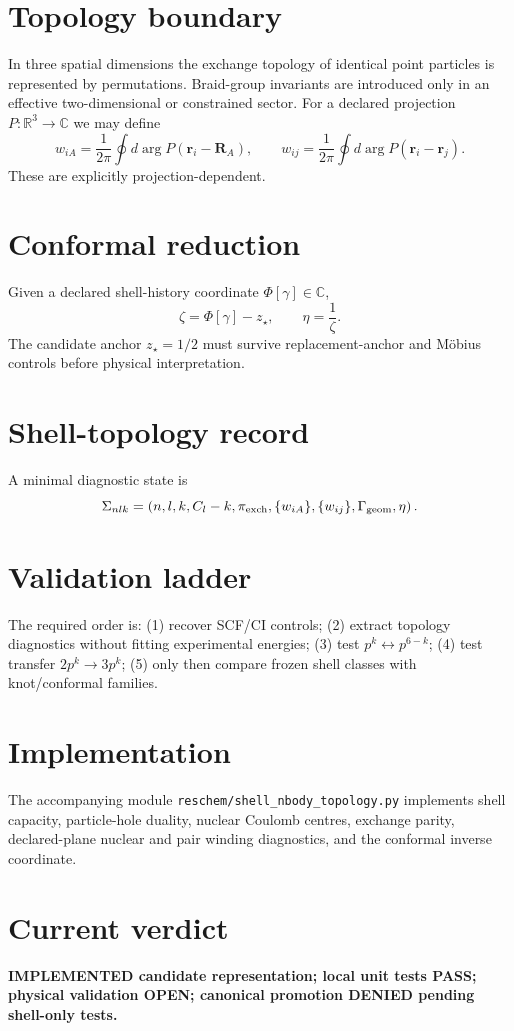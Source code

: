 \documentclass[11pt,a4paper]{article}
\begin{document}
\section{Topology boundary}
In three spatial dimensions the exchange topology of identical point particles is represented by permutations. Braid-group invariants are introduced only in an effective two-dimensional or constrained sector. For a declared projection $P:\mathbb R^3\to\mathbb C$ we may define
\begin{equation}
w_{iA}=\frac{1}{2\pi}\oint d\arg P(\mathbf r_i-\mathbf R_A),\qquad
w_{ij}=\frac{1}{2\pi}\oint d\arg P(\mathbf r_i-\mathbf r_j).
\end{equation}
These are explicitly projection-dependent.
\section{Conformal reduction}
Given a declared shell-history coordinate $\Phi[\gamma]\in\mathbb C$,
\begin{equation}
\zeta=\Phi[\gamma]-z_\star,\qquad \eta=\frac{1}{\zeta}.
\end{equation}
The candidate anchor $z_\star=1/2$ must survive replacement-anchor and Möbius controls before physical interpretation.
\section{Shell-topology record}
A minimal diagnostic state is
\begin{equation}
\Sigma_{nlk}=\left(n,l,k,C_l-k,\pi_{\rm exch},\{w_{iA}\},\{w_{ij}\},\Gamma_{\rm geom},\eta\right).
\end{equation}
\section{Validation ladder}
The required order is: (1) recover SCF/CI controls; (2) extract topology diagnostics without fitting experimental energies; (3) test $p^k\leftrightarrow p^{6-k}$; (4) test transfer $2p^k\to3p^k$; (5) only then compare frozen shell classes with knot/conformal families.
\section{Implementation}
The accompanying module \texttt{reschem/shell\_nbody\_topology.py} implements shell capacity, particle-hole duality, nuclear Coulomb centres, exchange parity, declared-plane nuclear and pair winding diagnostics, and the conformal inverse coordinate.
\section{Current verdict}
\textbf{IMPLEMENTED candidate representation; local unit tests PASS; physical validation OPEN; canonical promotion DENIED pending shell-only tests.}
\end{document}
